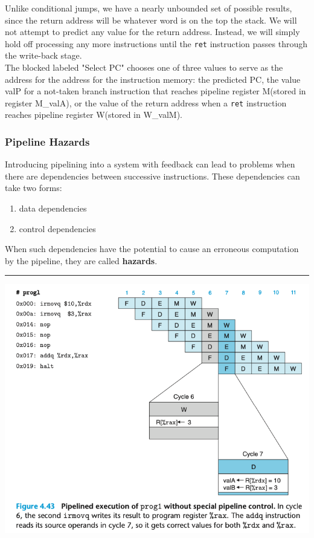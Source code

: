 \documentclass[11pt]{article}
\begin{document}
Unlike conditional jumps, we have a nearly unbounded set of possible results, since the return address will be whatever word is on the top the stack. We will not attempt to predict any value for the return address. Instead, we will simply hold off processing any more instructions until the \texttt{ret} instruction passes through the write-back stage.\\

The blocked labeled "Select PC" chooses one of three values to serve as the address for the address for the instruction memory: the predicted PC, the value valP for a not-taken branch instruction that reaches pipeline register M(stored in register M\_valA), or the value of the return address when a \texttt{ret} instruction reaches pipeline register W(stored in W\_valM).\\

\subsubsection{Pipeline Hazards}
\label{sec:org9e21f77}

Introducing pipelining into a system with feedback can lead to problems when there are dependencies between successive instructions. These dependencies can take two forms:\\
\begin{enumerate}
\item data dependencies\\
\item control dependencies\\
\end{enumerate}
When such dependencies have the potential to cause an erroneous computation by the pipeline, they are called \textbf{hazards}.\\


\noindent\rule{\textwidth}{0.5pt}

\begin{center}
\includegraphics[width=.9\linewidth]{pics/figure4.43.png}
\end{center}
\end{document}

